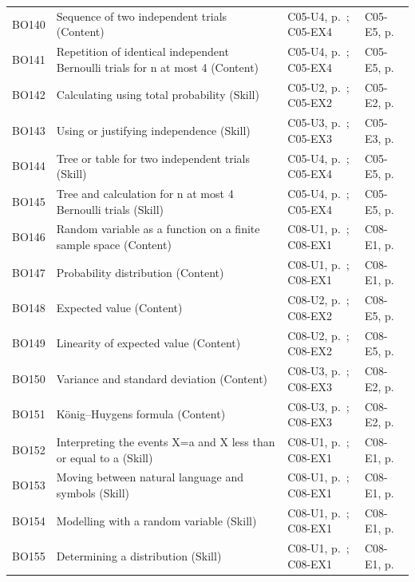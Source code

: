 \begin{longtable}{p{.1\linewidth}p{.43\linewidth}p{.19\linewidth}p{.16\linewidth}}
BO140 & Sequence of two independent trials (Content) & C05-U4, p.\,\pageref{C05-U4} ; C05-EX4 & C05-E5, p.\,\pageref{C05-E5} \\
BO141 & Repetition of identical independent Bernoulli trials for n at most 4 (Content) & C05-U4, p.\,\pageref{C05-U4} ; C05-EX4 & C05-E5, p.\,\pageref{C05-E5} \\
BO142 & Calculating using total probability (Skill) & C05-U2, p.\,\pageref{C05-U2} ; C05-EX2 & C05-E2, p.\,\pageref{C05-E2} \\
BO143 & Using or justifying independence (Skill) & C05-U3, p.\,\pageref{C05-U3} ; C05-EX3 & C05-E3, p.\,\pageref{C05-E3} \\
BO144 & Tree or table for two independent trials (Skill) & C05-U4, p.\,\pageref{C05-U4} ; C05-EX4 & C05-E5, p.\,\pageref{C05-E5} \\
BO145 & Tree and calculation for n at most 4 Bernoulli trials (Skill) & C05-U4, p.\,\pageref{C05-U4} ; C05-EX4 & C05-E5, p.\,\pageref{C05-E5} \\
BO146 & Random variable as a function on a finite sample space (Content) & C08-U1, p.\,\pageref{C08-U1} ; C08-EX1 & C08-E1, p.\,\pageref{C08-E1} \\
BO147 & Probability distribution (Content) & C08-U1, p.\,\pageref{C08-U1} ; C08-EX1 & C08-E1, p.\,\pageref{C08-E1} \\
BO148 & Expected value (Content) & C08-U2, p.\,\pageref{C08-U2} ; C08-EX2 & C08-E5, p.\,\pageref{C08-E5} \\
BO149 & Linearity of expected value (Content) & C08-U2, p.\,\pageref{C08-U2} ; C08-EX2 & C08-E5, p.\,\pageref{C08-E5} \\
BO150 & Variance and standard deviation (Content) & C08-U3, p.\,\pageref{C08-U3} ; C08-EX3 & C08-E2, p.\,\pageref{C08-E2} \\
BO151 & König–Huygens formula (Content) & C08-U3, p.\,\pageref{C08-U3} ; C08-EX3 & C08-E2, p.\,\pageref{C08-E2} \\
BO152 & Interpreting the events X=a and X less than or equal to a (Skill) & C08-U1, p.\,\pageref{C08-U1} ; C08-EX1 & C08-E1, p.\,\pageref{C08-E1} \\
BO153 & Moving between natural language and symbols (Skill) & C08-U1, p.\,\pageref{C08-U1} ; C08-EX1 & C08-E1, p.\,\pageref{C08-E1} \\
BO154 & Modelling with a random variable (Skill) & C08-U1, p.\,\pageref{C08-U1} ; C08-EX1 & C08-E1, p.\,\pageref{C08-E1} \\
BO155 & Determining a distribution (Skill) & C08-U1, p.\,\pageref{C08-U1} ; C08-EX1 & C08-E1, p.\,\pageref{C08-E1} \\

\end{longtable}
